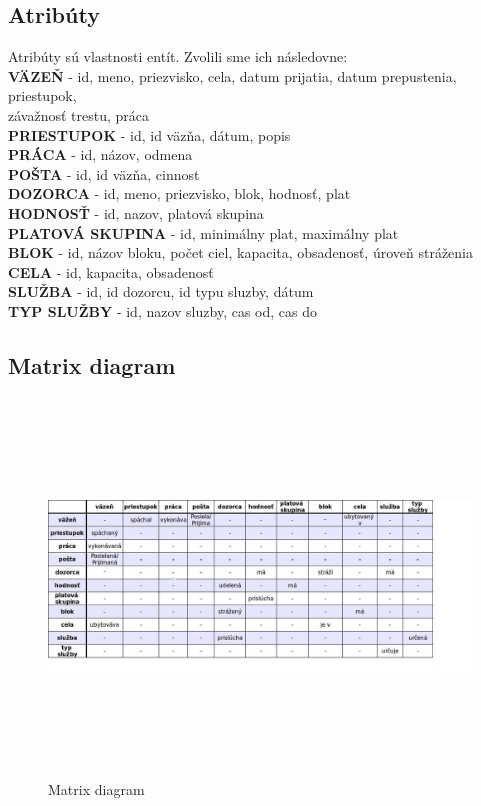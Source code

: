\documentclass[slovak, 12pt, Times New Roman]{article}
\begin{document}
		\subsection{Atribúty}
			Atribúty sú vlastnosti entít. Zvolili sme ich následovne: \\
			\textbf{VÄZEŇ} - id, meno, priezvisko, cela, datum prijatia, datum prepustenia, priestupok, \\ závažnosť trestu, práca\\
			\textbf{PRIESTUPOK} - id, id väzňa, dátum, popis\\
			\textbf{PRÁCA} - id, názov, odmena\\
			\textbf{POŠTA} - id, id väzňa, cinnost\\
			\textbf{DOZORCA} - id, meno, priezvisko, blok, hodnosť, plat \\
			\textbf{HODNOSŤ} - id, nazov, platová skupina\\
			\textbf{PLATOVÁ SKUPINA} - id, minimálny plat, maximálny plat\\
			\textbf{BLOK} - id, názov bloku, počet ciel, kapacita, obsadenosť, úroveň stráženia\\
			\textbf{CELA} - id, kapacita, obsadenosť\\
			\textbf{SLUŽBA} - id, id dozorcu, id typu sluzby, dátum\\
			\textbf{TYP SLUŽBY} - id, nazov sluzby, cas od, cas do\\
		\clearpage
		\subsection{Matrix diagram}
			\begin{figure}[!htb]
				\centering
				\includegraphics[width=19cm, height = 10cm]{matrixDia.png}
				\caption{Matrix diagram}
				\label{fig:Reinforcement}
			\end{figure}
			\clearpage
\end{document}
